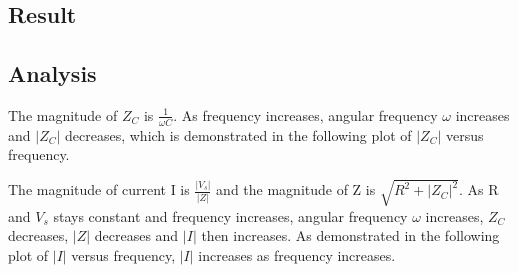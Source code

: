\documentclass{article}
\begin{document}
\subsection*{Result}
\begin{table}[H]
    \centering
\end{table}

\subsection*{Analysis}
The magnitude of $Z_C$ is $\frac{1}{\omega C}$. As frequency increases, angular frequency $\omega$ increases and $|Z_C|$ decreases, which is demonstrated in the following plot of $|Z_C|$ versus frequency.

The magnitude of current I is $\frac{|V_s|}{|Z|}$ and the magnitude of Z is $\sqrt{R^2+|Z_C|^2}$. As R and $V_s$ stays constant and frequency increases, angular frequency $\omega$ increases, $Z_C$ decreases, $|Z|$ decreases and $|I|$ then increases. As demonstrated in the following plot of $|I|$ versus frequency, $|I|$ increases as frequency increases.
\end{document}
